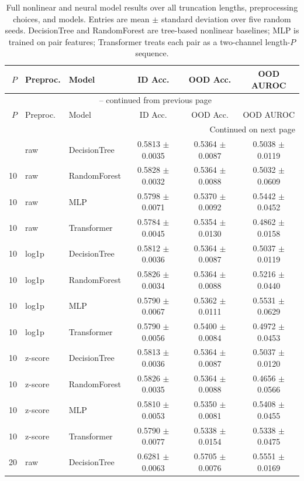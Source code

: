 \begin{longtable}{rllccc}
\hline\hline
\(P\) & Preproc. & Model & ID Acc. & OOD Acc. & OOD AUROC \\
\hline
\endfirsthead
\multicolumn{6}{c}{\tablename~\thetable{} -- continued from previous page}\\
\hline\hline
\(P\) & Preproc. & Model & ID Acc. & OOD Acc. & OOD AUROC \\
\hline
\endhead
\hline
\multicolumn{6}{r}{Continued on next page}\\
\endfoot
\hline\hline
\caption{Full nonlinear and neural model results over all truncation lengths, preprocessing choices, and models. Entries are mean $\pm$ standard deviation over five random seeds. DecisionTree and RandomForest are tree-based nonlinear baselines; MLP is trained on pair features; Transformer treats each pair as a two-channel length-\(P\) sequence.}
\label{tab:neural-full}
\endlastfoot
10 & raw & DecisionTree & 0.5813 $\pm$ 0.0035 & 0.5364 $\pm$ 0.0087 & 0.5038 $\pm$ 0.0119 \\
10 & raw & RandomForest & 0.5828 $\pm$ 0.0032 & 0.5364 $\pm$ 0.0088 & 0.5032 $\pm$ 0.0609 \\
10 & raw & MLP & 0.5798 $\pm$ 0.0071 & 0.5370 $\pm$ 0.0092 & 0.5442 $\pm$ 0.0452 \\
10 & raw & Transformer & 0.5784 $\pm$ 0.0045 & 0.5354 $\pm$ 0.0130 & 0.4862 $\pm$ 0.0158 \\
10 & log1p & DecisionTree & 0.5812 $\pm$ 0.0036 & 0.5364 $\pm$ 0.0087 & 0.5037 $\pm$ 0.0119 \\
10 & log1p & RandomForest & 0.5826 $\pm$ 0.0034 & 0.5364 $\pm$ 0.0088 & 0.5216 $\pm$ 0.0440 \\
10 & log1p & MLP & 0.5790 $\pm$ 0.0067 & 0.5362 $\pm$ 0.0111 & 0.5531 $\pm$ 0.0629 \\
10 & log1p & Transformer & 0.5790 $\pm$ 0.0056 & 0.5400 $\pm$ 0.0084 & 0.4972 $\pm$ 0.0453 \\
10 & z-score & DecisionTree & 0.5813 $\pm$ 0.0036 & 0.5364 $\pm$ 0.0087 & 0.5037 $\pm$ 0.0120 \\
10 & z-score & RandomForest & 0.5826 $\pm$ 0.0035 & 0.5364 $\pm$ 0.0088 & 0.4656 $\pm$ 0.0566 \\
10 & z-score & MLP & 0.5810 $\pm$ 0.0053 & 0.5350 $\pm$ 0.0081 & 0.5408 $\pm$ 0.0455 \\
10 & z-score & Transformer & 0.5790 $\pm$ 0.0077 & 0.5338 $\pm$ 0.0154 & 0.5338 $\pm$ 0.0475 \\
20 & raw & DecisionTree & 0.6281 $\pm$ 0.0063 & 0.5705 $\pm$ 0.0076 & 0.5551 $\pm$ 0.0169 \\

\end{longtable}
